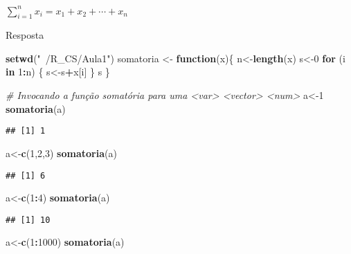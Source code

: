\documentclass[]{article}
\newenvironment{Shaded}{\begin{snugshade}}{\end{snugshade}}
\newcommand{\KeywordTok}[1]{\textcolor[rgb]{0.13,0.29,0.53}{\textbf{#1}}}
\newcommand{\DecValTok}[1]{\textcolor[rgb]{0.00,0.00,0.81}{#1}}
\newcommand{\StringTok}[1]{\textcolor[rgb]{0.31,0.60,0.02}{#1}}
\newcommand{\CommentTok}[1]{\textcolor[rgb]{0.56,0.35,0.01}{\textit{#1}}}
\newcommand{\ControlFlowTok}[1]{\textcolor[rgb]{0.13,0.29,0.53}{\textbf{#1}}}
\newcommand{\OperatorTok}[1]{\textcolor[rgb]{0.81,0.36,0.00}{\textbf{#1}}}
\newcommand{\NormalTok}[1]{#1}
\begin{document}
\({\displaystyle \sum _{i=1}^{n}x_{i}=x_{1}+x_{2}+\cdots +x_{n}}\)

Resposta

\begin{Shaded}
\begin{Highlighting}[]
\KeywordTok{setwd}\NormalTok{(}\StringTok{"~/R_CS/Aula1"}\NormalTok{)}
\NormalTok{somatoria <-}\StringTok{ }\ControlFlowTok{function}\NormalTok{(x)\{}
\NormalTok{  n<-}\KeywordTok{length}\NormalTok{(x)}
\NormalTok{  s<-}\DecValTok{0}
  \ControlFlowTok{for}\NormalTok{ (i }\ControlFlowTok{in} \DecValTok{1}\OperatorTok{:}\NormalTok{n) \{}
\NormalTok{    s<-s}\OperatorTok{+}\NormalTok{x[i]}
\NormalTok{  \}}
\NormalTok{  s}
\NormalTok{\}}

\CommentTok{# Invocando a função somatória para uma <var> <vector> <num>}
\NormalTok{a<-}\DecValTok{1}
\KeywordTok{somatoria}\NormalTok{(a)}
\end{Highlighting}
\end{Shaded}

\begin{verbatim}
## [1] 1
\end{verbatim}

\begin{Shaded}
\begin{Highlighting}[]
\NormalTok{a<-}\KeywordTok{c}\NormalTok{(}\DecValTok{1}\NormalTok{,}\DecValTok{2}\NormalTok{,}\DecValTok{3}\NormalTok{)}
\KeywordTok{somatoria}\NormalTok{(a)}
\end{Highlighting}
\end{Shaded}

\begin{verbatim}
## [1] 6
\end{verbatim}

\begin{Shaded}
\begin{Highlighting}[]
\NormalTok{a<-}\KeywordTok{c}\NormalTok{(}\DecValTok{1}\OperatorTok{:}\DecValTok{4}\NormalTok{)}
\KeywordTok{somatoria}\NormalTok{(a)}
\end{Highlighting}
\end{Shaded}

\begin{verbatim}
## [1] 10
\end{verbatim}

\begin{Shaded}
\begin{Highlighting}[]
\NormalTok{a<-}\KeywordTok{c}\NormalTok{(}\DecValTok{1}\OperatorTok{:}\DecValTok{1000}\NormalTok{)}
\KeywordTok{somatoria}\NormalTok{(a)}
\end{Highlighting}
\end{Shaded}
\end{document}
